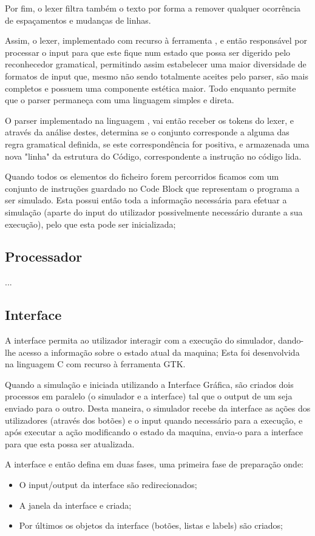 \documentclass{report}
\begin{document}
Por fim, o lexer filtra também o texto por forma a remover qualquer ocorrência de espaçamentos e mudanças de linhas.

\quad Assim, o lexer, implementado com recurso à ferramenta {\FLEX}, e então responsável por processar o input para que este fique num estado que possa ser digerido pelo reconhecedor gramatical,
permitindo assim estabelecer uma maior diversidade de formatos de input que, mesmo não sendo totalmente aceites pelo
parser, são mais completos e possuem uma componente estética maior. Todo enquanto permite que o parser permaneça com
uma linguagem simples e direta.

\quad O parser implementado na linguagem {\YACC}, vai então receber os tokens do lexer, e através da análise destes, determina se o conjunto
corresponde a alguma das regra gramatical definida, se este correspondência for positiva, e armazenada
uma nova "linha" da estrutura do Código, correspondente a instrução no código lida.

\quad Quando todos os elementos do ficheiro forem percorridos ficamos com um conjunto de instruções guardado no Code Block que
representam o programa a ser simulado. Esta possui então toda a informação necessária para
efetuar a simulação (aparte do input do utilizador possivelmente necessário
durante a sua execução), pelo que esta pode ser inicializada;

\subsection{Processador}
\quad ...
\subsection{Interface}
\quad A interface permita ao utilizador interagir com a execução do simulador, dando-lhe acesso a informação sobre o estado atual da maquina;
Esta foi desenvolvida na linguagem C com recurso à ferramenta GTK.

Quando a simulação e iniciada utilizando a Interface Gráfica, são criados dois processos em paralelo (o simulador e a interface) tal que
o output de um seja enviado para o outro. Desta maneira, o simulador recebe da interface
as ações dos utilizadores (através dos botões) e o input quando necessário para a execução, e
após executar a ação modificando o estado da maquina,  envia-o para a interface para que esta possa ser atualizada.

A interface e então defina em duas fases, uma primeira fase de preparação onde:
\begin{itemize}
	\item O input/output da interface são redirecionados;
	\item A janela da interface e criada;
	\item Por últimos os objetos da interface (botões, listas e labels) são criados;
\end{itemize}
\end{document}
